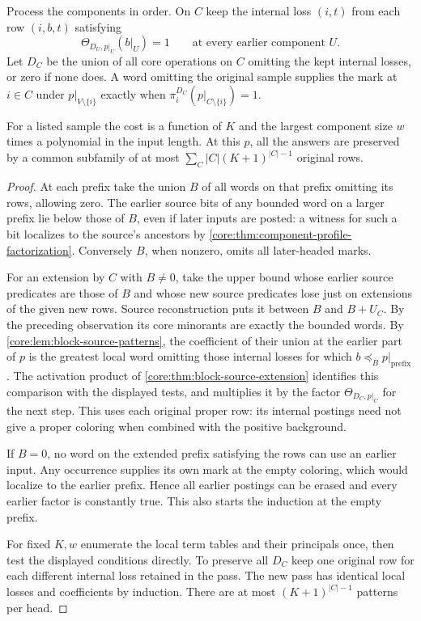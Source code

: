\begin{theorem}
\label{core:thm:component-mark-sweep}
Process the components in order. On $C$ keep the internal loss
$(i,t)$ from each row $(i,b,t)$ satisfying
\[
       \Theta_{D_U,p|_U}(b|_U)=1
       \qquad\text{at every earlier component }U.
\]
Let $D_C$ be the union of all core operations on $C$ omitting the
kept internal losses, or zero if none does. A word omitting the
original sample supplies the mark at $i\in C$ under
$p|_{V\setminus\{i\}}$ exactly when
$\pi_i^{D_C}(p|_{C\setminus\{i\}})=1$.

For a listed sample the cost is a function of $K$ and the largest
component size $w$ times a polynomial in the input length. At this
$p$, all the answers are preserved by a common subfamily of at most
$\sum_C |C|(K+1)^{|C|-1}$ original rows.
\end{theorem}
\begin{proof}
At each prefix take the union $B$ of all words on that prefix
omitting its rows, allowing zero. The earlier source bits of any
bounded word on a larger prefix lie below those of $B$, even if
later inputs are posted: a witness for such a bit localizes to
the source's ancestors by \cref{core:thm:component-profile-factorization}.
Conversely $B$, when nonzero, omits all later-headed marks.

For an extension by $C$ with $B\ne0$, take the upper bound whose
earlier source predicates are those of $B$ and whose new source
predicates lose just on extensions of the given new rows.
Source reconstruction puts it between $B$ and $B+U_C$.
By the preceding observation its core minorants are exactly
the bounded words. By \cref{core:lem:block-source-patterns}, the
coefficient of their union at the earlier part of $p$ is the
greatest local word omitting those internal losses for which
$b\preceq_B p|_{\mathrm{prefix}}$. The activation product of
\cref{core:thm:block-source-extension} identifies this comparison
with the displayed tests, and multiplies it by the factor
$\Theta_{D_C,p|_C}$ for the next step. This uses each original
proper row: its internal postings need not give a proper coloring
when combined with the positive background.

If $B=0$, no word on the extended prefix satisfying the rows can
use an earlier input. Any occurrence supplies its own mark at the
empty coloring, which would localize to the earlier prefix. Hence
all earlier postings can be erased and every earlier factor is
constantly true. This also starts the induction at the empty prefix.

For fixed $K,w$ enumerate the local term tables and their principals
once, then test the displayed conditions directly. To preserve all
$D_C$ keep one original row for each different internal loss retained
in the pass. The new pass has identical local losses and coefficients
by induction. There are at most $(K+1)^{|C|-1}$ patterns per head.
\end{proof}

